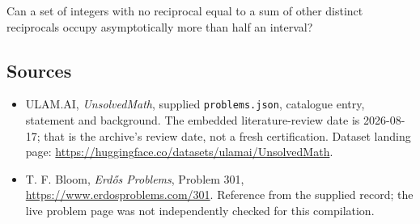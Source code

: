 \documentclass[11pt,a4paper]{article}
\begin{document}
Can a set of integers with no reciprocal equal to a sum of other distinct reciprocals occupy asymptotically more than half an interval?

\subsection{Sources}

{\small

\begin{itemize}

\item[\hypertarget{source:statement:1}{S1}] ULAM.AI, \emph{UnsolvedMath}, supplied \texttt{problems.json}, catalogue entry, statement and background. The embedded literature-review date is 2026-08-17; that is the archive’s review date, not a fresh certification. Dataset landing page: \url{https://huggingface.co/datasets/ulamai/UnsolvedMath}.

\item[\hypertarget{source:statement:2}{S2}] T. F. Bloom, \emph{Erdős Problems}, Problem 301, \url{https://www.erdosproblems.com/301}. Reference from the supplied record; the live problem page was not independently checked for this compilation.

\end{itemize}

}

\label{end:statement}
\end{document}

